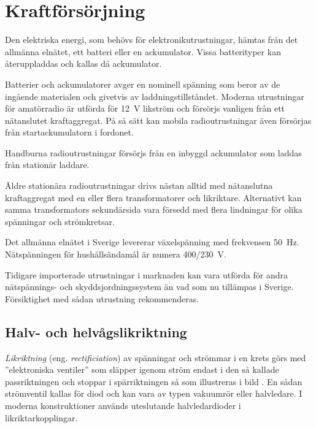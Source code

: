 \section{Kraftförsörjning}
\label{kraftaggregat}
\label{kraftförsörjning}

Den elektriska energi, som behövs för elektronikutrustningar, hämtas
från det allmänna elnätet, ett batteri eller en
ackumulator.
Vissa batterityper kan återuppladdas och kallas då ackumulator.

Batterier och ackumulatorer avger en nominell spänning som beror av
de ingående materialen och givetvis av laddningstillståndet.
Moderna utrustningar för amatörradio är utförda för \SI{12}{\volt} likström och
försörjs vanligen från ett nätanslutet kraftaggregat.
På så sätt kan mobila radioutrustningar även försörjas från startackumulatorn
i fordonet.

Handburna radioutrustningar försörjs från en inbyggd ackumulator som laddas
från stationär laddare.

Äldre stationära radioutrustningar drivs nästan alltid med nätanslutna
kraftaggregat med en eller flera transformatorer och likriktare.
Alternativt kan samma transformators sekundärsida vara
försedd med flera lindningar för olika spänningar och strömkretsar.

Det allmänna elnätet i Sverige levererar växelspänning med frekvensen
\SI{50}{\hertz}.
Nätspänningen för hushållsändamål är numera 400/\SI{230}{\volt}.

Tidigare importerade utrustningar i marknaden kan vara utförda för andra
nätspännings- och skyddsjordningssystem än vad som nu tillämpas i Sverige.
Försiktighet med sådan utrustning rekommenderas.


\subsection{Halv- och helvågslikriktning}
\label{likriktning}

\emph{Likriktning} (eng. \emph{rectificiation}) av spänningar och strömmar i en
krets görs med ''elektroniska ventiler'' som släpper igenom ström endast i den
så kallade passriktningen och stoppar i spärriktningen så som illustreras i
bild .
En sådan strömventil kallas för diod och kan vara av typen vakuumrör eller
halvledare.
I moderna konstruktioner används uteslutande halvledardioder i
likriktarkopplingar.

